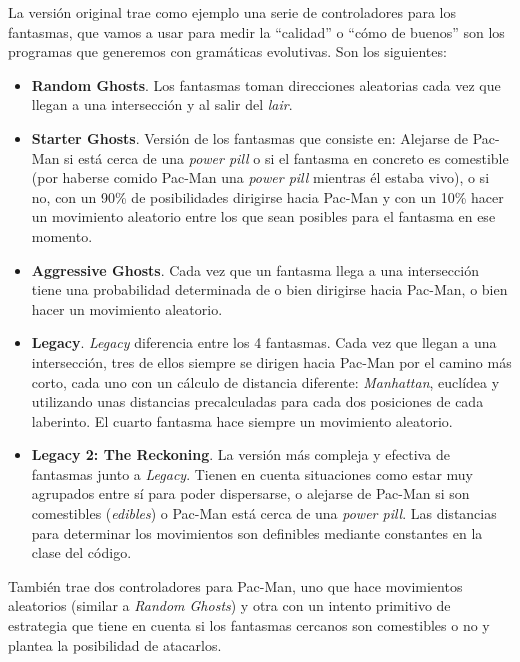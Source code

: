 La versión original trae como ejemplo una serie de controladores para los fantasmas, que vamos a usar para medir la ``calidad'' o ``cómo de buenos'' son los programas que generemos con gramáticas evolutivas. Son los siguientes:
\begin{itemize}
\item \textbf{Random Ghosts}. Los fantasmas toman direcciones aleatorias cada vez que llegan a una intersección y al salir del \textit{lair}.

\item \textbf{Starter Ghosts}. Versión de los fantasmas que consiste en: Alejarse de Pac-Man si está cerca de una \textit{power pill} o si el fantasma en concreto es comestible (por haberse comido Pac-Man una \textit{power pill} mientras él estaba vivo), o si no, con un 90\% de posibilidades dirigirse hacia Pac-Man y con un 10\% hacer un movimiento aleatorio entre los que sean posibles para el fantasma en ese momento.

\item \textbf{Aggressive Ghosts}. Cada vez que un fantasma llega a una intersección tiene una probabilidad determinada de o bien dirigirse hacia Pac-Man, o bien hacer un movimiento aleatorio.

\item \textbf{Legacy}. \textit{Legacy} diferencia entre los 4 fantasmas. Cada vez que llegan a una intersección, tres de ellos siempre se dirigen hacia Pac-Man por el camino más corto, cada uno con un cálculo de distancia diferente: \textit{Manhattan}, euclídea y utilizando unas distancias precalculadas para cada dos posiciones de cada laberinto. El cuarto fantasma hace siempre un movimiento aleatorio.

\item \textbf{Legacy 2: The Reckoning}. La versión más compleja y efectiva de fantasmas junto a \textit{Legacy}. Tienen en cuenta situaciones como estar muy agrupados entre sí para poder dispersarse, o alejarse de Pac-Man si son comestibles (\textit{edibles}) o Pac-Man está cerca de una \textit{power pill}. Las distancias para determinar los movimientos son definibles mediante constantes en la clase del código.
\end{itemize}
 
También trae dos controladores para Pac-Man, uno que hace movimientos aleatorios (similar a \textit{Random Ghosts}) y otra con un intento primitivo de estrategia que tiene en cuenta si los fantasmas cercanos son comestibles o no y plantea la posibilidad de atacarlos.


